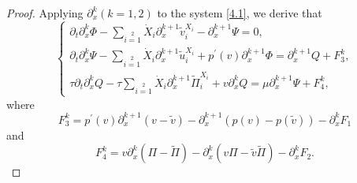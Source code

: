 \documentclass[10pt,a4paper]{amsart}
\begin{document}
\begin{proof}
Applying $\partial^k_x(k=1,2)$ to the system \eqref{4.1}, we derive that
\begin{equation}\label{4.10}
\begin{cases}
\partial_{t}\partial_{x}^k\Phi
-\sum\limits_{i=1}\limits^2\dot{X}_i\partial_{x}^{k+1}\widetilde{v}_i^{X_i}-\partial_{x}^{k+1}\Psi=0,\\
\partial_{t}\partial_{x}^k\Psi
-\sum\limits_{i=1}\limits^2\dot{X}_i\partial_{x}^{k+1}\widetilde{u}_i^{X_i}
          +p^{\prime}(v)\partial_{x}^{k+1}\Phi=\partial_{x}^{k+1}Q+F_3^k,\\
\tau\partial_{t}\partial_{x}^kQ
-\tau\sum\limits_{i=1}\limits^2\dot{X}_i\partial_{x}^{k+1}\widetilde{\Pi}_i^{X_i}
             +v\partial_{x}^{k}Q=\mu\partial_{x}^{k+1}\Psi+F_4^k,
\end{cases}
\end{equation}
where $$F_3^k=p^{\prime}(v)\partial^{k+1}_{x}(v-\widetilde{v})-\partial^{k+1}_{x}(p(v)-p(\widetilde{v}))
-\partial^k_{x}F_1$$
and
$$F_4^k=v\partial^k_{x}(\Pi-\widetilde{\Pi})-\partial^k_{x}(v\Pi-\widetilde{v}\widetilde{\Pi})
-\partial^k_{x}F_2.$$


\end{proof}
\end{document}
